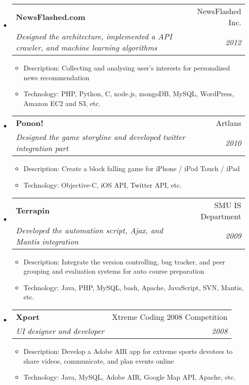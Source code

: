 \documentclass[twoside,letterpaper,11pt]{article}
\makeatletter
\newcommand{\resitem}[1]{\item #1 \vspace{-5pt}}
\newcommand{\resheading}[1]{
  \parbox{\textwidth}{
    \begin{shaded}
      \textbf{\sffamily{\mbox{~}{\large #1} \vphantom{p\^{E}}}}
    \end{shaded}
  }\vspace{-6px}
}
\newcommand{\ressubheading}[4]{
\begin{tabular*}{7in}{l@{\extracolsep{\fill}}r}
		\textbf{#1} & #2 \\
		\textit{#3} & \textit{#4} \\
\end{tabular*}\vspace{-6pt}}
\makeatother
\begin{document}
\resheading{Projects}
\begin{itemize}
\item
	\ressubheading{NewsFlashed.com}{NewsFlashed Inc.}{Designed the architecture, implemented a API crawler, and machine learning algorithms}{2012}
	\begin{itemize}
		\resitem{Description: Collecting and analysing user's interests for personalized news recommendation}
		\resitem{Technology: PHP, Python, C, node.js, mongoDB, MySQL, WordPress, Amazon EC2 and S3, etc.}
	\end{itemize}


\item
	\ressubheading{Ponon!}{Artlans}{Designed the game storyline and developed twitter integration part}{2010}
	\begin{itemize}
		\resitem{Description: Create a block falling game for iPhone / iPod Touch / iPad}
		\resitem{Technology: Objective-C, iOS API, Twitter API, etc.}
	\end{itemize}

\item 
	\ressubheading{Terrapin}{SMU IS Department}{Developed the automation script, Ajax, and Mantis integration
}{2009}
	\begin{itemize}
		\resitem{Description: Integrate the version controlling, bug tracker, and peer grouping and evaluation systems for auto course preparation}
		\resitem{Technology: Java, PHP, MySQL, bash, Apache, JavaScript, SVN, Mantis, etc.}
	\end{itemize}

\item
	\ressubheading{Xport}{Xtreme Coding 2008 Competition}{UI designer and developer}{2008}
	\begin{itemize}
		\resitem{Description: Develop a Adobe AIR app for extreme sports devotees to share videos, communicate, and plan events online}
		\resitem{Technology: Java, MySQL, Adobe AIR, Google Map API, Apache, etc.}
	\end{itemize}


\end{itemize}
\end{document}
